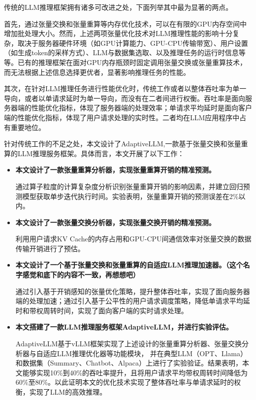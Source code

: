 传统的LLM推理框架拥有诸多可改进之处，下面列举其中最为显著的两点。 \par

首先，通过张量交换和张量重算等内存优化技术，可以在有限的GPU内存空间中增加批处理大小。然而，上述两项张量优化技术对LLM推理性能的影响十分复杂，取决于服务器硬件环境（如GPU计算能力、GPU-CPU传输带宽）、用户设置（如生成token的采样方式）、LLM与数据集选取、以及推理任务的运行时信息等等。已有的推理框架\cite{Swapping, vLLM, ORCA}在面对GPU内存瓶颈时固定调用张量交换或张量重算技术，而无法根据上述信息选择更优者，显著影响推理任务的性能。 \par

其次，在针对LLM推理任务进行性能优化时，传统工作\cite{Swapping, vLLM, SpecInfer}或者以整体吞吐率为单一导向，或者以单请求延时为单一导向，而没有在二者间进行权衡。吞吐率是面向服务器端的性能优化指标，体现了服务器端的处理效率；单请求平均延时是面向客户端的性能优化指标，体现了用户请求处理的实时性。二者均在LLM应用程序中占有重要地位。\par

针对传统工作的不足之处，本文设计了AdaptiveLLM,一款基于张量交换和张量重算的LLM推理服务框架。具体而言，本文开展了以下工作：

\begin{itemize} 
    \item { \textbf{本文设计了一款张量重算分析器，实现张量重算开销的精准预测。} 
    \setlength{\parindent}{2em} \par
    通过算子粒度的计算复杂度分析识别张量重算开销的影响因素，并建立回归预测模型获取单步迭代执行时间。实验表明，张量重算开销的预测误差在2\%以内。}
    \item \textbf{本文设计了一款张量交换分析器，实现张量交换开销的精准预测。}
    \setlength{\parindent}{2em} \par
    利用用户请求KV Cache的内存占用和GPU-CPU间通信效率对张量交换的数据传输开销进行了预估。
    \item \textbf{本文设计了一个基于张量交换和张量重算的自适应LLM推理加速器。（这个名字感觉和底下的内容不一致，再想想吧）}
    \setlength{\parindent}{2em} \par
    通过引入基于开销感知的张量优化策略，提升整体吞吐率，实现了面向服务器端的处理加速；通过引入基于公平性的用户请求调度策略，降低单请求平均延时和带权周转时间，实现了面向客户端的实时请求处理。
    \item \textbf{本文搭建了一款LLM推理服务框架AdaptiveLLM，并进行实验评估。}
    \setlength{\parindent}{2em} \par
    AdaptiveLLM基于vLLM框架实现了上述设计的张量重算分析器、张量交换分析器与自适应LLM推理优化器等功能模块， 并在典型LLM（OPT\cite{OPT}、Llama\cite{Llama}）和数据集（Summary\cite{Summary}、Chatbot\cite{Chatbot}、Alpaca\cite{Alpaca}）上进行了实验验证。结果表明，本文能够实现10\%到40\%的吞吐率提升，且将用户请求平均带权周转时间降低为60\%至80\%。以此证明本文的优化技术实现了整体吞吐率与单请求延时的权衡，实现了LLM的高效推理。
\end{itemize}